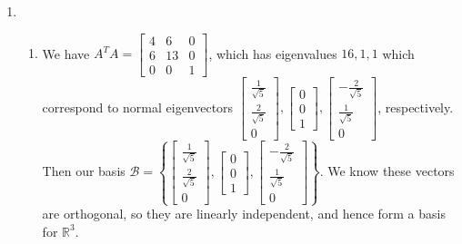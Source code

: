 \documentclass[10pt,english]{article}
\begin{document}
\begin{enumerate}
    \pagebreak
    \item \begin{enumerate}
        \item We have $A^TA=\begin{bmatrix}4&6&0\\6&13&0\\0&0&1\end{bmatrix}$, which has eigenvalues $16,1,1$ which correspond to normal eigenvectors $\begin{bmatrix}\frac{1}{\sqrt{5}}\\\frac{2}{\sqrt{5}}\\0\end{bmatrix},\begin{bmatrix}0\\0\\1\end{bmatrix},\begin{bmatrix}-\frac{2}{\sqrt{5}}\\\frac{1}{\sqrt{5}}\\0\end{bmatrix}$, respectively. Then our basis $\mathcal{B}=\left\{\begin{bmatrix}\frac{1}{\sqrt{5}}\\\frac{2}{\sqrt{5}}\\0\end{bmatrix},\begin{bmatrix}0\\0\\1\end{bmatrix},\begin{bmatrix}-\frac{2}{\sqrt{5}}\\\frac{1}{\sqrt{5}}\\0\end{bmatrix}\right\}$. We know these vectors are orthogonal, so they are linearly independent, and hence form a basis for $\mathbb{R}^3$. 

\end{enumerate}
\end{enumerate}
\end{document}
